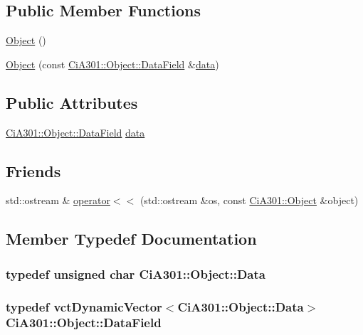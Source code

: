 \subsection*{Public Member Functions}
\begin{DoxyCompactItemize}
\item 
\hyperlink{struct_ci_a301_1_1_object_ab365a7598e622b5b507787697683d093}{Object} ()
\item 
\hyperlink{struct_ci_a301_1_1_object_aca61b59c9441700459832e7943e0eeb6}{Object} (const \hyperlink{struct_ci_a301_1_1_object_a2344da0462f8dd535bbf311be83d435a}{Ci\-A301\-::\-Object\-::\-Data\-Field} \&\hyperlink{struct_ci_a301_1_1_object_a73870d74c7ffaaf07515bf4a5d5330ea}{data})
\end{DoxyCompactItemize}
\subsection*{Public Attributes}
\begin{DoxyCompactItemize}
\item 
\hyperlink{struct_ci_a301_1_1_object_a2344da0462f8dd535bbf311be83d435a}{Ci\-A301\-::\-Object\-::\-Data\-Field} \hyperlink{struct_ci_a301_1_1_object_a73870d74c7ffaaf07515bf4a5d5330ea}{data}
\end{DoxyCompactItemize}
\subsection*{Friends}
\begin{DoxyCompactItemize}
\item 
std\-::ostream \& \hyperlink{struct_ci_a301_1_1_object_a0f593415e55eb9ec790ba65258158a19}{operator$<$$<$} (std\-::ostream \&os, const \hyperlink{struct_ci_a301_1_1_object}{Ci\-A301\-::\-Object} \&object)
\end{DoxyCompactItemize}


\subsection{Member Typedef Documentation}
\hypertarget{struct_ci_a301_1_1_object_a9fd091097bb03da4a28a403485c3a10f}{
\subsubsection[{Data}]{\setlength{\rightskip}{0pt plus 5cm}typedef unsigned char {\bf Ci\-A301\-::\-Object\-::\-Data}}}\label{struct_ci_a301_1_1_object_a9fd091097bb03da4a28a403485c3a10f}
\hypertarget{struct_ci_a301_1_1_object_a2344da0462f8dd535bbf311be83d435a}{
\subsubsection[{Data\-Field}]{\setlength{\rightskip}{0pt plus 5cm}typedef {\bf vct\-Dynamic\-Vector}$<${\bf Ci\-A301\-::\-Object\-::\-Data}$>$ {\bf Ci\-A301\-::\-Object\-::\-Data\-Field}}}\label{struct_ci_a301_1_1_object_a2344da0462f8dd535bbf311be83d435a}


